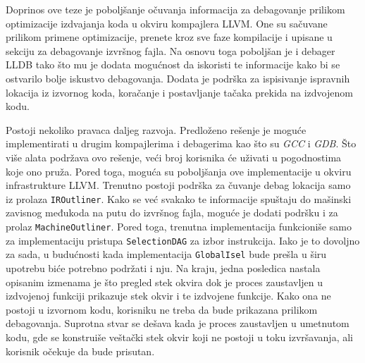 \documentclass[12pt,oneside]{memoir}
\begin{document}
Doprinos ove teze je poboljšanje očuvanja informacija za debagovanje prilikom optimizacije izdvajanja koda u okviru kompajlera LLVM.
One su sačuvane prilikom primene optimizacije, prenete kroz sve faze kompilacije i upisane u sekciju za debagovanje izvršnog fajla.
Na osnovu toga poboljšan je i debager LLDB tako što mu je dodata mogućnost da iskoristi te informacije kako bi se ostvarilo bolje iskustvo debagovanja.
Dodata je podrška za ispisivanje ispravnih lokacija iz izvornog koda, koračanje i postavljanje tačaka prekida na izdvojenom kodu.


Postoji nekoliko pravaca daljeg razvoja.
Predloženo rešenje je moguće implementirati u drugim kompajlerima i debagerima kao što su \textit{GCC} i \textit{GDB}.
Što više alata podržava ovo rešenje, veći broj korisnika će uživati u pogodnostima koje ono pruža.
Pored toga, moguća su poboljšanja ove implementacije u okviru infrastrukture LLVM.
Trenutno postoji podrška za čuvanje debag lokacija samo iz prolaza \verb|IROutliner|.
Kako se već svakako te informacije spuštaju do mašinski zavisnog međukoda na putu do izvršnog fajla, moguće je dodati podršku i za prolaz \verb|MachineOutliner|.
Pored toga, trenutna implementacija funkcioniše samo za implementaciju pristupa \verb|SelectionDAG| za izbor instrukcija.
Iako je to dovoljno za sada, u budućnosti kada implementacija \verb|GlobalIsel| bude prešla u širu upotrebu biće potrebno podržati i nju.
Na kraju, jedna posledica nastala opisanim izmenama je što pregled stek okvira dok je proces zaustavljen u izdvojenoj funkciji prikazuje stek okvir i te izdvojene funkcije.
Kako ona ne postoji u izvornom kodu, korisniku ne treba da bude prikazana prilikom debagovanja.
Suprotna stvar se dešava kada je proces zaustavljen u umetnutom kodu, gde se konstruiše veštački stek okvir koji ne postoji u toku izvršavanja, ali korisnik očekuje da bude prisutan.
\end{document}
